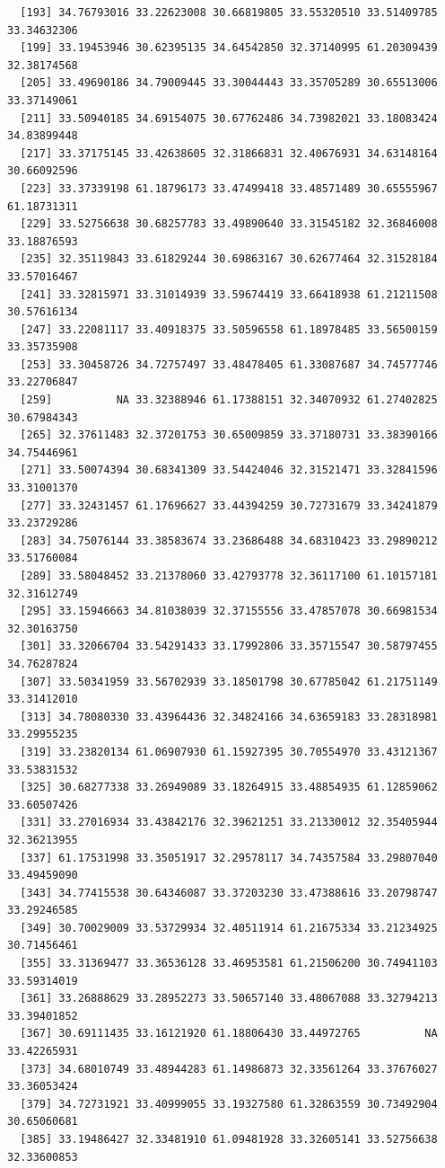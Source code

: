 \documentclass[
  letterpaper,
  DIV=11,
  numbers=noendperiod]{scrartcl}
\begin{document}
\begin{verbatim}
  [193] 34.76793016 33.22623008 30.66819805 33.55320510 33.51409785 33.34632306
  [199] 33.19453946 30.62395135 34.64542850 32.37140995 61.20309439 32.38174568
  [205] 33.49690186 34.79009445 33.30044443 33.35705289 30.65513006 33.37149061
  [211] 33.50940185 34.69154075 30.67762486 34.73982021 33.18083424 34.83899448
  [217] 33.37175145 33.42638605 32.31866831 32.40676931 34.63148164 30.66092596
  [223] 33.37339198 61.18796173 33.47499418 33.48571489 30.65555967 61.18731311
  [229] 33.52756638 30.68257783 33.49890640 33.31545182 32.36846008 33.18876593
  [235] 32.35119843 33.61829244 30.69863167 30.62677464 32.31528184 33.57016467
  [241] 33.32815971 33.31014939 33.59674419 33.66418938 61.21211508 30.57616134
  [247] 33.22081117 33.40918375 33.50596558 61.18978485 33.56500159 33.35735908
  [253] 33.30458726 34.72757497 33.48478405 61.33087687 34.74577746 33.22706847
  [259]          NA 33.32388946 61.17388151 32.34070932 61.27402825 30.67984343
  [265] 32.37611483 32.37201753 30.65009859 33.37180731 33.38390166 34.75446961
  [271] 33.50074394 30.68341309 33.54424046 32.31521471 33.32841596 33.31001370
  [277] 33.32431457 61.17696627 33.44394259 30.72731679 33.34241879 33.23729286
  [283] 34.75076144 33.38583674 33.23686488 34.68310423 33.29890212 33.51760084
  [289] 33.58048452 33.21378060 33.42793778 32.36117100 61.10157181 32.31612749
  [295] 33.15946663 34.81038039 32.37155556 33.47857078 30.66981534 32.30163750
  [301] 33.32066704 33.54291433 33.17992806 33.35715547 30.58797455 34.76287824
  [307] 33.50341959 33.56702939 33.18501798 30.67785042 61.21751149 33.31412010
  [313] 34.78080330 33.43964436 32.34824166 34.63659183 33.28318981 33.29955235
  [319] 33.23820134 61.06907930 61.15927395 30.70554970 33.43121367 33.53831532
  [325] 30.68277338 33.26949089 33.18264915 33.48854935 61.12859062 33.60507426
  [331] 33.27016934 33.43842176 32.39621251 33.21330012 32.35405944 32.36213955
  [337] 61.17531998 33.35051917 32.29578117 34.74357584 33.29807040 33.49459090
  [343] 34.77415538 30.64346087 33.37203230 33.47388616 33.20798747 33.29246585
  [349] 30.70029009 33.53729934 32.40511914 61.21675334 33.21234925 30.71456461
  [355] 33.31369477 33.36536128 33.46953581 61.21506200 30.74941103 33.59314019
  [361] 33.26888629 33.28952273 33.50657140 33.48067088 33.32794213 33.39401852
  [367] 30.69111435 33.16121920 61.18806430 33.44972765          NA 33.42265931
  [373] 34.68010749 33.48944283 61.14986873 32.33561264 33.37676027 33.36053424
  [379] 34.72731921 33.40999055 33.19327580 61.32863559 30.73492904 30.65060681
  [385] 33.19486427 32.33481910 61.09481928 33.32605141 33.52756638 32.33600853

\end{verbatim}
\end{document}
